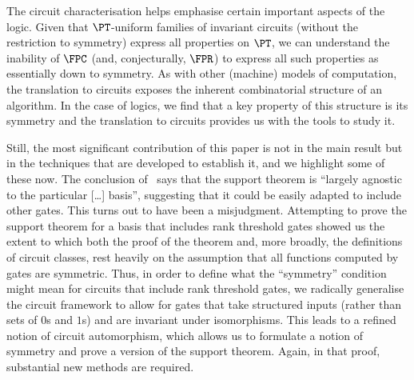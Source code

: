 \documentclass[a4paper,UKenglish]{lipics-v2018}
\begin{document}
The circuit characterisation helps emphasise certain important aspects of
the logic. Given that $\PT$-uniform families of invariant circuits (without the
restriction to symmetry) express all properties on $\PT$, we can understand the
inability of $\FPC$ (and, conjecturally, $\FPR$) to express all such properties
as essentially down to symmetry. As with other (machine) models of computation,
the translation to circuits exposes the inherent combinatorial structure of an
algorithm. In the case of logics, we find that a key property of this structure
is its symmetry and the translation to circuits provides us with the tools to
study it.

Still, the most significant contribution of this paper is not in the main result
but in the techniques that are developed to establish it, and we highlight some
of these now. The conclusion of~\cite{AndersonD17} says that the support theorem
is ``largely agnostic to the particular [\ldots] basis'', suggesting that it
could be easily adapted to include other gates. This turns out to have been a
misjudgment. Attempting to prove the support theorem for a basis that includes
rank threshold gates showed us the extent to which both the proof of the theorem
and, more broadly, the definitions of circuit classes, rest heavily on the
assumption that all functions computed by gates are symmetric. Thus, in order to
define what the ``symmetry'' condition might mean for circuits that include rank
threshold gates, we radically generalise the circuit framework to allow for
gates that take structured inputs (rather than sets of $0$s and $1$s) and are
invariant under isomorphisms. This leads to a refined notion of circuit
automorphism, which allows us to formulate a notion of symmetry and prove a
version of the support theorem. Again, in that proof, substantial new methods
are required.

\end{document}
